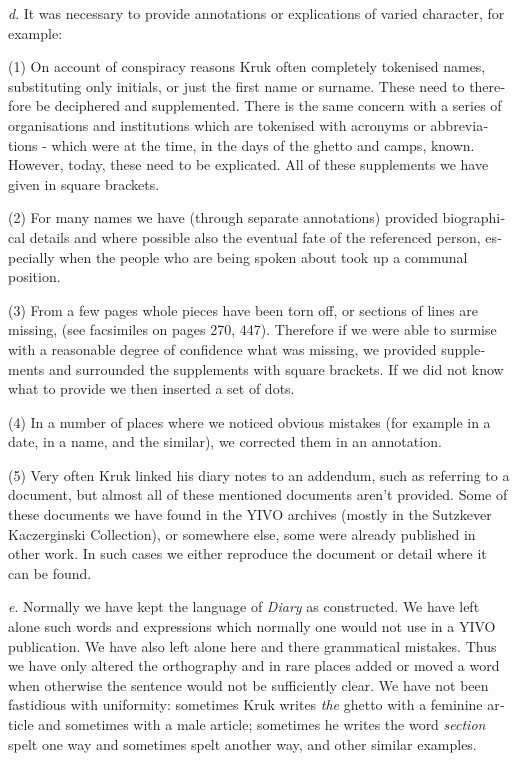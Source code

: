 \documentclass{article}
\begin{document}
\begin{pairs}
\begin{Leftside}
\begin{english}
\emph{d}. It was necessary to provide annotations or explications of varied character, for example:


(1) On account of conspiracy reasons Kruk often completely tokenised names, substituting
only initials, or just the first name or surname. These need to therefore be deciphered and
supplemented. There is the same concern with a series of organisations and institutions which
are tokenised with acronyms or abbreviations - which were at the time, in the days of the
ghetto and camps, known. However, today, these need to be explicated. All of these supplements we
have given in square brackets.

(2) For many names we have (through separate annotations) provided biographical details
and where possible also the eventual fate of the referenced person, especially when the people
who are being spoken about took up a communal position.

(3) From a few pages whole pieces have been torn off, or sections of lines are missing, (see
facsimiles on pages 270, 447). Therefore if we were able to surmise with a reasonable
degree of confidence what was missing, we provided supplements and surrounded the supplements
with square brackets. If we did not know what to provide we then inserted a set of dots.

(4) In a number of places where we noticed obvious mistakes (for example in a date, in a name, and the similar),
we corrected them in an annotation.

(5) Very often Kruk linked his diary notes to an addendum, such as referring to a document, but
almost all of these mentioned documents aren't provided. Some of these documents we have
found in the YIVO archives (mostly in the Sutzkever Kaczerginski Collection),
or somewhere else, some were already published in other work. In such cases we either reproduce the document or detail where it can be found.

\emph{e}. Normally we have kept the language of \emph{Diary} as constructed. We have left alone such words
and expressions which normally one would not use in a YIVO publication. We have also left alone here
and there grammatical mistakes. Thus we have only altered the orthography and in rare places added or moved a word
when otherwise the sentence would not be sufficiently clear. We have not been fastidious with uniformity: sometimes Kruk
writes \emph{the} ghetto  with a feminine article and sometimes with a male article; sometimes he writes the word \emph{section}
spelt one way and sometimes spelt another way, and other similar examples. 


\end{english}
\end{Leftside}
\end{pairs}
\end{document}
